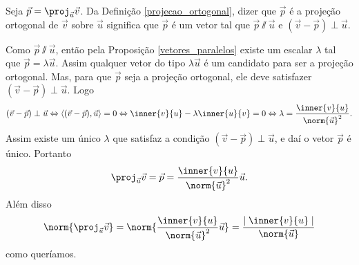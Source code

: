 \begin{prova}
  Seja $\vec{p} = \proj_{\vec{u}}\vec{v}$. Da Definição \ref{projecao_ortogonal}, dizer que $\vec{p}$ é a projeção ortogonal de $\vec{v}$ sobre $\vec{u}$ significa que $\vec{p}$ é um vetor tal que $\vec{p}\varparallel\vec{u}$ e $(\vec{v} - \vec{p})\perp\vec{u}$.

  Como $\vec{p}\varparallel\vec{u}$, então pela Proposição \ref{vetores_paralelos} existe um escalar $\lambda$ tal que $\vec{p} = \lambda\vec{u}$. Assim qualquer vetor do tipo $\lambda\vec{u}$ é um candidato para ser a projeção ortogonal. Mas, para que $\vec{p}$ seja a projeção ortogonal, ele deve satisfazer $(\vec{v} - \vec{p})\perp\vec{u}$. Logo
  \begin{align*}
    (\vec{v} - \vec{p})\perp\vec{u} \Leftrightarrow \langle(\vec{v} - \vec{p}), \vec{u}\rangle = 0 \Leftrightarrow \inner{v}{u} - \lambda\inner{u}{v} = 0 \Leftrightarrow \lambda = \dfrac{\inner{v}{u}}{\norm{\vec{u}}^2}.
  \end{align*}
  Assim existe um único $\lambda$ que satisfaz a condição $(\vec{v} - \vec{p})\perp\vec{u}$, e daí o vetor $\vec{p}$ é único. Portanto
  \[
    \proj_{\vec{u}}\vec{v} = \vec{p} = \dfrac{\inner{v}{u}}{\norm{\vec{u}}^2}\vec{u}.
  \]
  Além disso
  \[
    \norm{\proj_{\vec{u}}\vec{v}} = \norm{\dfrac{\inner{v}{u}}{\norm{\vec{u}}^2}\vec{u}} = \dfrac{\mid\inner{v}{u}\mid}{\norm{\vec{u}}}
  \]
  como queríamos.
\end{prova}


